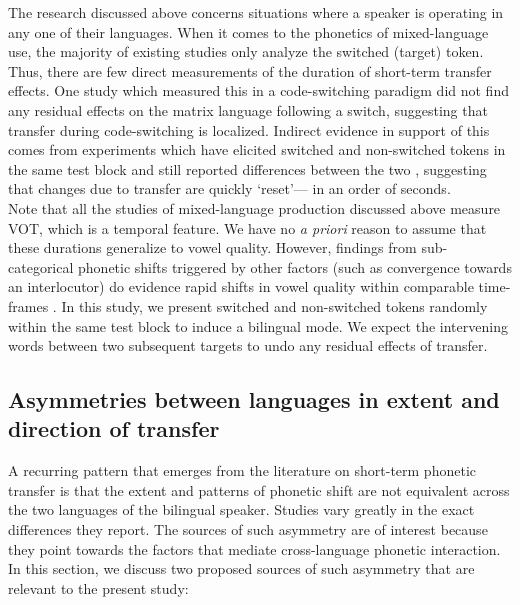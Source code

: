 \documentclass[12 pt]{article}
\begin{document}
The research discussed above concerns situations where a speaker is operating in any one of their languages. When it comes to the phonetics of mixed-language use, the majority of existing studies only analyze the switched (target) token. Thus, there are few direct measurements of the duration of short-term transfer effects. One study which measured this in a code-switching paradigm \citep[][VOT]{bullock2009trying} did not find any residual effects on the matrix language following a switch, suggesting that transfer during code-switching is localized. Indirect evidence in support of this comes from experiments which have elicited switched and non-switched tokens in the same test block and still reported differences between the two \citep[e.g.][VOT]{tsui2019impact,olson2013bilingual}, suggesting that changes due to transfer are quickly `reset'--- in an order of seconds.\\
Note that all the studies of mixed-language production discussed above measure VOT, which is a temporal feature. We have no \textit{a priori} reason to assume that these durations generalize to vowel quality. However, findings from sub-categorical phonetic shifts triggered by other factors (such as convergence towards an interlocutor) do evidence rapid shifts in vowel quality within comparable time-frames \citep[e.g.][]{pardo2010expressing,babel2010dialect,babel2012evidence}. In this study, we present switched and non-switched tokens randomly within the same test block to induce a bilingual mode. We expect the intervening words between two subsequent targets to undo any residual effects of transfer.

\subsection{Asymmetries between languages in extent and direction of transfer} \label{asymmetries}
A recurring pattern that emerges from the literature on short-term phonetic transfer is that the extent and patterns of phonetic shift are not equivalent across the two languages of the bilingual speaker. Studies vary greatly in the exact differences they report. The sources of such asymmetry are of interest because they point towards the factors that mediate cross-language phonetic interaction. In this section, we discuss two proposed sources of such asymmetry that are relevant to the present study: 
\end{document}
